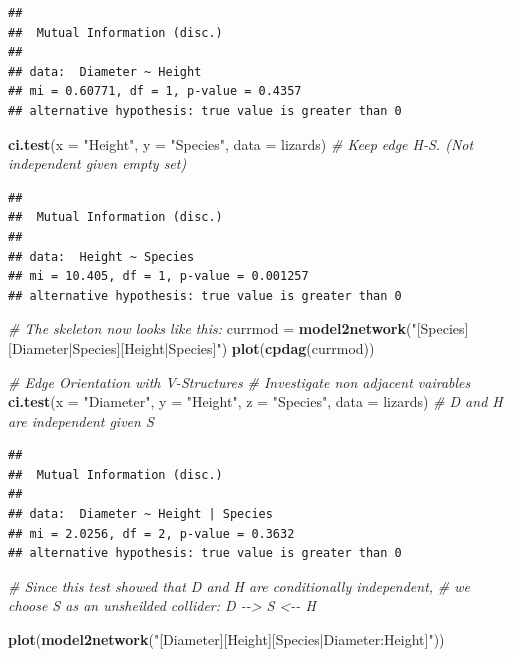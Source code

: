 \documentclass[
]{article}
\newenvironment{Shaded}{\begin{snugshade}}{\end{snugshade}}
\newcommand{\AttributeTok}[1]{\textcolor[rgb]{0.13,0.29,0.53}{#1}}
\newcommand{\CommentTok}[1]{\textcolor[rgb]{0.56,0.35,0.01}{\textit{#1}}}
\newcommand{\FunctionTok}[1]{\textcolor[rgb]{0.13,0.29,0.53}{\textbf{#1}}}
\newcommand{\NormalTok}[1]{#1}
\newcommand{\OtherTok}[1]{\textcolor[rgb]{0.56,0.35,0.01}{#1}}
\newcommand{\StringTok}[1]{\textcolor[rgb]{0.31,0.60,0.02}{#1}}
\begin{document}
\begin{verbatim}
## 
##  Mutual Information (disc.)
## 
## data:  Diameter ~ Height  
## mi = 0.60771, df = 1, p-value = 0.4357
## alternative hypothesis: true value is greater than 0
\end{verbatim}

\begin{Shaded}
\begin{Highlighting}[]
\FunctionTok{ci.test}\NormalTok{(}\AttributeTok{x =} \StringTok{"Height"}\NormalTok{, }\AttributeTok{y =} \StringTok{"Species"}\NormalTok{, }\AttributeTok{data =}\NormalTok{ lizards)    }\CommentTok{\# Keep edge H{-}S. (Not independent given empty set)}
\end{Highlighting}
\end{Shaded}

\begin{verbatim}
## 
##  Mutual Information (disc.)
## 
## data:  Height ~ Species  
## mi = 10.405, df = 1, p-value = 0.001257
## alternative hypothesis: true value is greater than 0
\end{verbatim}

\begin{Shaded}
\begin{Highlighting}[]
\CommentTok{\# The skeleton now looks like this:}
\NormalTok{currmod }\OtherTok{=} \FunctionTok{model2network}\NormalTok{(}\StringTok{"[Species][Diameter|Species][Height|Species]"}\NormalTok{)}
\FunctionTok{plot}\NormalTok{(}\FunctionTok{cpdag}\NormalTok{(currmod))}

\CommentTok{\# Edge Orientation with V{-}Structures}
\CommentTok{\# Investigate non adjacent vairables}
\FunctionTok{ci.test}\NormalTok{(}\AttributeTok{x =} \StringTok{"Diameter"}\NormalTok{, }\AttributeTok{y =} \StringTok{"Height"}\NormalTok{, }\AttributeTok{z =} \StringTok{"Species"}\NormalTok{, }\AttributeTok{data =}\NormalTok{ lizards) }\CommentTok{\# D and H are independent given S}
\end{Highlighting}
\end{Shaded}

\begin{verbatim}
## 
##  Mutual Information (disc.)
## 
## data:  Diameter ~ Height | Species
## mi = 2.0256, df = 2, p-value = 0.3632
## alternative hypothesis: true value is greater than 0
\end{verbatim}

\begin{Shaded}
\begin{Highlighting}[]
\CommentTok{\# Since this test showed that D and H are conditionally independent, }
\CommentTok{\# we choose S as an unsheilded collider: D {-}{-}\textgreater{} S \textless{}{-}{-} H}


\FunctionTok{plot}\NormalTok{(}\FunctionTok{model2network}\NormalTok{(}\StringTok{"[Diameter][Height][Species|Diameter:Height]"}\NormalTok{))}
\end{Highlighting}
\end{Shaded}
\end{document}
